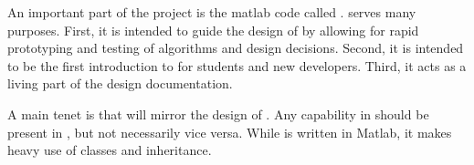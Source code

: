 An important part of the \mloo project is the matlab code called \muemat.
\muemat serves many purposes.  First, it is intended to guide the design of \mloo by allowing for rapid prototyping and
testing of algorithms and design decisions.
Second, it is intended to be the first introduction to \mloo for students and new developers.
Third, it acts as a living part of the design documentation.

A main tenet is that \muemat will mirror the design of \mloo.  Any capability in \mloo should be present in \muemat, but
not necessarily vice versa.  While \muemat is written in Matlab, it makes heavy use of classes and inheritance.




